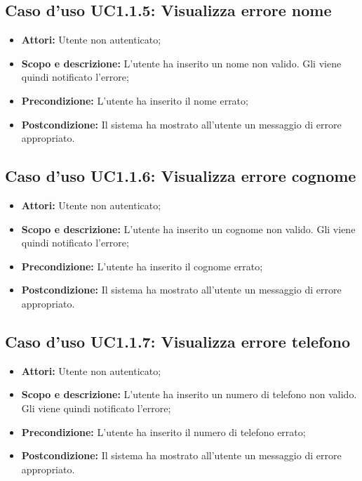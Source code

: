 \documentclass[12pt,a4paper,titlepage]{article}
\begin{document}
	\subsection{Caso d'uso UC1.1.5: Visualizza errore nome}
	\label{UC1.1.5}
	\begin{itemize}
		\item \textbf{Attori:} Utente non autenticato;
		\item \textbf{Scopo e descrizione:} L'utente ha inserito un nome non valido. Gli viene quindi notificato l'errore;
		\item \textbf{Precondizione:} L'utente ha inserito il nome errato;
		\item \textbf{Postcondizione:} Il sistema ha mostrato all'utente un messaggio di errore appropriato.
	\end{itemize}
	\subsection{Caso d'uso UC1.1.6: Visualizza errore cognome}
	\label{UC1.1.6}
	\begin{itemize}
		\item \textbf{Attori:} Utente non autenticato;
		\item \textbf{Scopo e descrizione:} L'utente ha inserito un cognome non valido. Gli viene quindi notificato l'errore;
		\item \textbf{Precondizione:} L'utente ha inserito il cognome errato;
		\item \textbf{Postcondizione:} Il sistema ha mostrato all'utente un messaggio di errore appropriato.
	\end{itemize}
	\subsection{Caso d'uso UC1.1.7: Visualizza errore telefono}
	\label{UC1.1.7}
	\begin{itemize}
		\item \textbf{Attori:} Utente non autenticato;
		\item \textbf{Scopo e descrizione:} L'utente ha inserito un numero di telefono non valido. Gli viene quindi notificato l'errore;
		\item \textbf{Precondizione:} L'utente ha inserito il numero di telefono errato;
		\item \textbf{Postcondizione:} Il sistema ha mostrato all'utente un messaggio di errore appropriato.
	\end{itemize}
\end{document}
